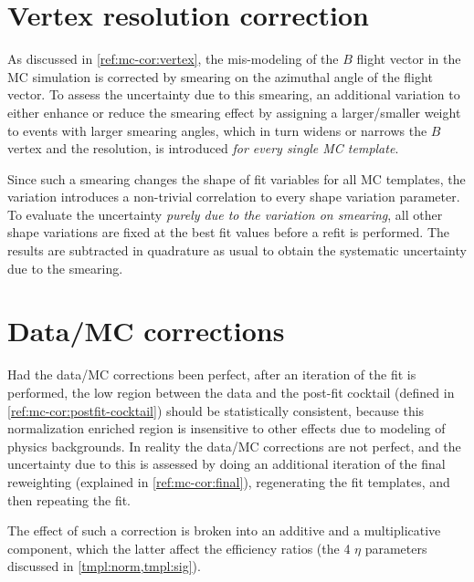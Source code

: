 \section{Vertex resolution correction}
\label{sys-cor-vtx}

As discussed in \cref{ref:mc-cor:vertex},
the mis-modeling of the $B$ flight vector in the MC simulation is corrected by
smearing on the azimuthal angle of the flight vector.
To assess the uncertainty due to this smearing,
an additional variation to either enhance or reduce the smearing effect
by assigning a larger/smaller weight to events with larger smearing angles,
which in turn widens or narrows the $B$ vertex and the \mmSq resolution,
is introduced \emph{for every single MC template}.

Since such a smearing changes the shape of fit variables for all MC templates,
the variation introduces a non-trivial correlation to every
shape variation parameter.
To evaluate the uncertainty \emph{purely due to the variation on smearing},
all other shape variations are fixed at the best fit values before a refit is
performed.
The results are subtracted in quadrature as usual to obtain the systematic
uncertainty due to the smearing.


\section{Data/MC corrections}
\label{sys-cor-rwt}

Had the data/MC corrections been perfect,
after an iteration of the fit is performed,
the low \mmSq region between the data and the post-fit cocktail
(defined in \cref{ref:mc-cor:postfit-cocktail}) should be statistically
consistent,
because this normalization enriched region is insensitive to other effects
due to modeling of physics backgrounds.
In reality the data/MC corrections are not perfect,
and the uncertainty due to this is assessed by doing an additional iteration of
the final reweighting (explained in \cref{ref:mc-cor:final}),
regenerating the fit templates,
and then repeating the fit.

The effect of such a correction is broken into an additive and a multiplicative
component, which the latter affect the efficiency ratios
(the 4 $\eta$ parameters discussed in \cref{tmpl:norm,tmpl:sig}).

